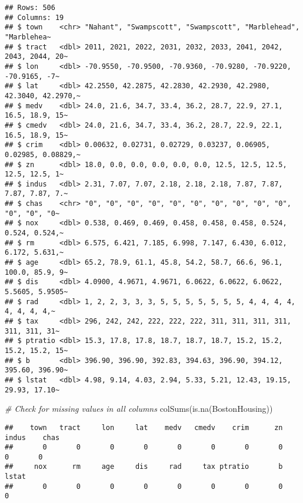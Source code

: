 \documentclass[
]{book}
\newenvironment{Shaded}{\begin{snugshade}}{\end{snugshade}}
\newcommand{\CommentTok}[1]{\textcolor[rgb]{0.56,0.35,0.01}{\textit{#1}}}
\newcommand{\FunctionTok}[1]{\textcolor[rgb]{0.00,0.00,0.00}{#1}}
\newcommand{\NormalTok}[1]{#1}
\begin{document}
\begin{verbatim}
## Rows: 506
## Columns: 19
## $ town    <chr> "Nahant", "Swampscott", "Swampscott", "Marblehead", "Marblehea~
## $ tract   <dbl> 2011, 2021, 2022, 2031, 2032, 2033, 2041, 2042, 2043, 2044, 20~
## $ lon     <dbl> -70.9550, -70.9500, -70.9360, -70.9280, -70.9220, -70.9165, -7~
## $ lat     <dbl> 42.2550, 42.2875, 42.2830, 42.2930, 42.2980, 42.3040, 42.2970,~
## $ medv    <dbl> 24.0, 21.6, 34.7, 33.4, 36.2, 28.7, 22.9, 27.1, 16.5, 18.9, 15~
## $ cmedv   <dbl> 24.0, 21.6, 34.7, 33.4, 36.2, 28.7, 22.9, 22.1, 16.5, 18.9, 15~
## $ crim    <dbl> 0.00632, 0.02731, 0.02729, 0.03237, 0.06905, 0.02985, 0.08829,~
## $ zn      <dbl> 18.0, 0.0, 0.0, 0.0, 0.0, 0.0, 12.5, 12.5, 12.5, 12.5, 12.5, 1~
## $ indus   <dbl> 2.31, 7.07, 7.07, 2.18, 2.18, 2.18, 7.87, 7.87, 7.87, 7.87, 7.~
## $ chas    <chr> "0", "0", "0", "0", "0", "0", "0", "0", "0", "0", "0", "0", "0~
## $ nox     <dbl> 0.538, 0.469, 0.469, 0.458, 0.458, 0.458, 0.524, 0.524, 0.524,~
## $ rm      <dbl> 6.575, 6.421, 7.185, 6.998, 7.147, 6.430, 6.012, 6.172, 5.631,~
## $ age     <dbl> 65.2, 78.9, 61.1, 45.8, 54.2, 58.7, 66.6, 96.1, 100.0, 85.9, 9~
## $ dis     <dbl> 4.0900, 4.9671, 4.9671, 6.0622, 6.0622, 6.0622, 5.5605, 5.9505~
## $ rad     <dbl> 1, 2, 2, 3, 3, 3, 5, 5, 5, 5, 5, 5, 5, 4, 4, 4, 4, 4, 4, 4, 4,~
## $ tax     <dbl> 296, 242, 242, 222, 222, 222, 311, 311, 311, 311, 311, 311, 31~
## $ ptratio <dbl> 15.3, 17.8, 17.8, 18.7, 18.7, 18.7, 15.2, 15.2, 15.2, 15.2, 15~
## $ b       <dbl> 396.90, 396.90, 392.83, 394.63, 396.90, 394.12, 395.60, 396.90~
## $ lstat   <dbl> 4.98, 9.14, 4.03, 2.94, 5.33, 5.21, 12.43, 19.15, 29.93, 17.10~
\end{verbatim}

\begin{Shaded}
\begin{Highlighting}[]
\CommentTok{\# Check for missing values in all columns}
\FunctionTok{colSums}\NormalTok{(}\FunctionTok{is.na}\NormalTok{(BostonHousing))}
\end{Highlighting}
\end{Shaded}

\begin{verbatim}
##    town   tract     lon     lat    medv   cmedv    crim      zn   indus    chas 
##       0       0       0       0       0       0       0       0       0       0 
##     nox      rm     age     dis     rad     tax ptratio       b   lstat 
##       0       0       0       0       0       0       0       0       0
\end{verbatim}
\end{document}
